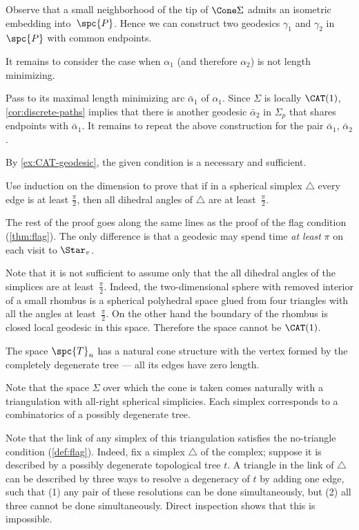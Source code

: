 Observe that a small neighborhood of the tip of $\Cone\Sigma$ admits an isometric embedding into~$\spc{P}$.
Hence we can construct two geodesics $\gamma_1$ and $\gamma_2$ in $\spc{P}$ with common endpoints.

It remains to consider the case when $\alpha_1$ (and therefore $\alpha_2$) is not length minimizing.

Pass to its maximal length minimizing arc $\bar\alpha_1$ of $\alpha_1$.
Since $\Sigma$ is locally $\CAT(1)$, \ref{cor:discrete-paths} implies that 
there is another geodesic $\bar\alpha_2$ in $\Sigma_p$ that shares endpoints with $\bar\alpha_1$.
It remains to repeat the above construction for the pair $\bar\alpha_1$, $\bar\alpha_2$.


By \ref{ex:CAT-geodesic}, the given condition is a necessary and sufficient.

Use induction on the dimension  to prove that if in a spherical simplex $\triangle$ every edge is at least $\tfrac\pi2$, then 
all dihedral angles of $\triangle$ are at least~$\tfrac\pi2$.

The rest of the proof goes along the same lines as the proof of the flag condition (\ref{thm:flag}).
The only difference is that a geodesic may spend time \emph{at least} $\pi$ on each visit to $\Star_v$.

Note that it is not sufficient to assume only that the all dihedral angles of the simplices are at least~$\tfrac\pi2$. 
Indeed, the two-dimensional sphere with removed interior of a small rhombus is a spherical polyhedral space glued from four triangles with all the angles at least~$\tfrac\pi2$.
On the other hand the boundary of the rhombus is closed local geodesic in this space.
Therefore the space cannot be $\CAT(1)$.

The space $\spc{T}_n$ has a natural cone structure with the vertex formed by the  completely degenerate tree --- all its edges have zero length.

Note that the space $\Sigma$
over which the cone is taken comes naturally with a triangulation 
with all-right spherical simplicies.
Each simplex corresponds to a combinatorics of a possibly degenerate tree.

Note that the link of any simplex of this triangulation satisfies the no-triangle condition (\ref{def:flag}).
Indeed, fix a simplex $\triangle$ of the complex;
suppose it is described by a possibly degenerate topological tree $t$.
A triangle in the link of  $\triangle$ can be described by three ways to resolve a degeneracy of $t$ by adding one edge,
such that (1) any pair of these resolutions can be done simultaneously, but (2) all three cannot be done simultaneously.
Direct inspection shows that this is impossible.

